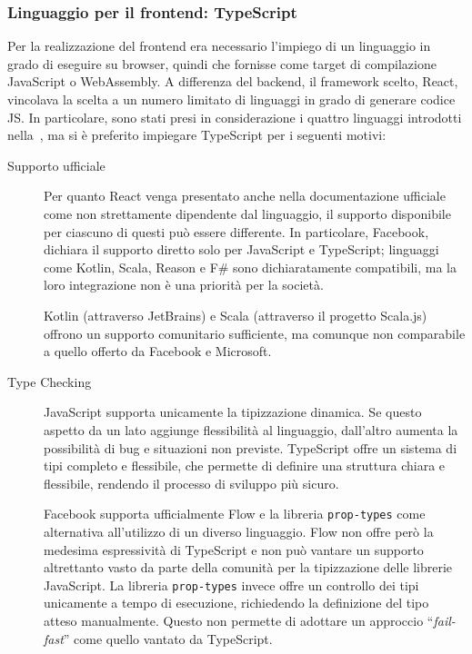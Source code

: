     \subsubsection{Linguaggio per il frontend: TypeScript}
      Per la realizzazione del frontend era necessario l'impiego di un linguaggio in grado di eseguire su browser, quindi che fornisse come target di compilazione JavaScript o WebAssembly.
      A differenza del backend, il framework scelto, React, vincolava la scelta a un numero limitato di linguaggi in grado di generare codice JS\@.
      In particolare, sono stati presi in considerazione i quattro linguaggi introdotti nella~, ma si è preferito impiegare TypeScript per i seguenti motivi:

      \begin{description}
        \item[Supporto ufficiale]
          Per quanto React venga presentato anche nella documentazione ufficiale~\cite{react-docs} come non strettamente dipendente dal linguaggio, il supporto disponibile per ciascuno di questi può essere differente.
          In particolare, Facebook, dichiara il supporto diretto solo per JavaScript e TypeScript;
          linguaggi come Kotlin, Scala, Reason e F\# sono dichiaratamente compatibili, ma la loro integrazione non è una priorità per la società.

          Kotlin (attraverso JetBrains) e Scala (attraverso il progetto Scala.js) offrono un supporto comunitario sufficiente, ma comunque non comparabile a quello offerto da Facebook e Microsoft.

        \item[Type Checking]
          JavaScript supporta unicamente la tipizzazione dinamica.
          Se questo aspetto da un lato aggiunge flessibilità al linguaggio, dall'altro aumenta la possibilità di bug e situazioni non previste.
          TypeScript offre un sistema di tipi completo e flessibile, che permette di definire una struttura chiara e flessibile, rendendo il processo di sviluppo più sicuro.

          Facebook supporta ufficialmente Flow e la libreria \texttt{prop-types} come alternativa all'utilizzo di un diverso linguaggio.
          Flow non offre però la medesima espressività di TypeScript e non può vantare un supporto altrettanto vasto da parte della comunità per la tipizzazione delle librerie JavaScript.
          La libreria \texttt{prop-types} invece offre un controllo dei tipi unicamente a tempo di esecuzione, richiedendo la definizione del tipo atteso manualmente.
          Questo non permette di adottare un approccio ``\emph{fail-fast}'' come quello vantato da TypeScript.


\end{description}
